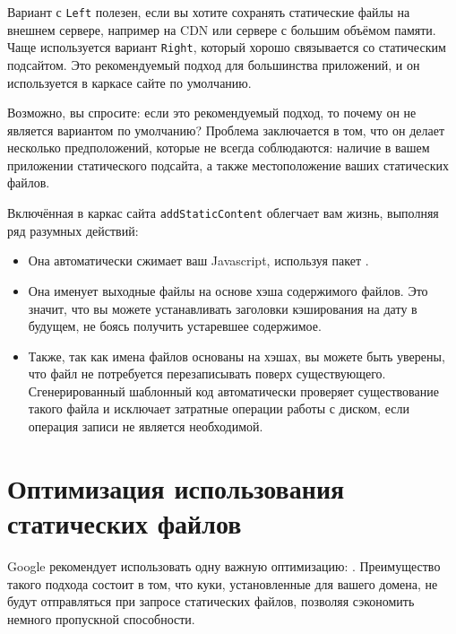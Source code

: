 Вариант с \lstinline!Left! полезен, если вы хотите сохранять статические файлы
на внешнем сервере, например на CDN или сервере с большим объёмом памяти. Чаще
используется вариант \lstinline!Right!, который хорошо связывается со
статическим подсайтом. Это рекомендуемый подход для большинства приложений, и
он используется в каркасе сайте по умолчанию.

\begin{remark}
    Возможно, вы спросите: если это рекомендуемый подход, то почему он не
    является вариантом по умолчанию? Проблема заключается в том, что он делает
    несколько предположений, которые не всегда соблюдаются: наличие в вашем
    приложении статического подсайта, а также местоположение ваших статических
    файлов.
\end{remark}

Включённая в каркас сайта \lstinline!addStaticContent! облегчает вам жизнь,
выполняя ряд разумных действий:
\begin{itemize}
  \item Она автоматически сжимает ваш Javascript, используя пакет
      .

  \item Она именует выходные файлы на основе хэша содержимого файлов. Это
      значит, что вы можете устанавливать заголовки кэширования на дату в
      будущем, не боясь получить устаревшее содержимое.

  \item Также, так как имена файлов основаны на хэшах, вы можете быть уверены,
      что файл не потребуется перезаписывать поверх существующего.
      Сгенерированный шаблонный код автоматически проверяет существование
      такого файла и исключает затратные операции работы с диском, если
      операция записи не является необходимой.
\end{itemize}

\section {Оптимизация использования статических файлов}

Google рекомендует использовать одну важную оптимизацию:
.
Преимущество такого подхода состоит в том, что куки, установленные для вашего
домена, не будут отправляться при запросе статических файлов, позволяя
сэкономить немного пропускной способности.

